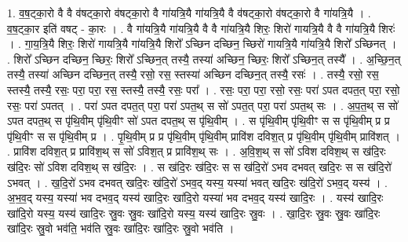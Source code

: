 \documentclass[17pt]{extarticle}
\begin{document}
1. व॒ष॒ट्का॒रो वै वै व॑षट्का॒रो व॑षट्का॒रो वै गा॑यत्रि॒यै गा॑यत्रि॒यै वै व॑षट्का॒रो व॑षट्का॒रो वै गा॑यत्रि॒यै । . व॒ष॒ट्का॒र इति॑ वषट् - का॒रः । . वै गा॑यत्रि॒यै गा॑यत्रि॒यै वै वै गा॑यत्रि॒यै शिरः॒ शिरो॑ गायत्रि॒यै वै वै गा॑यत्रि॒यै शिरः॑ । . गा॒य॒त्रि॒यै शिरः॒ शिरो॑ गायत्रि॒यै गा॑यत्रि॒यै शिरो᳚ ऽच्छिन दच्छिन॒ च्छिरो॑ गायत्रि॒यै गा॑यत्रि॒यै शिरो᳚ ऽच्छिनत् । . शिरो᳚ ऽच्छिन दच्छिन॒ च्छिरः॒ शिरो᳚ ऽच्छिन॒त् तस्यै॒ तस्या॑ अच्छिन॒ च्छिरः॒ शिरो᳚ ऽच्छिन॒त् तस्यै᳚ । . अ॒च्छि॒न॒त् तस्यै॒ तस्या॑ अच्छिन दच्छिन॒त् तस्यै॒ रसो॒ रस॒ स्तस्या॑ अच्छिन दच्छिन॒त् तस्यै॒ रसः॑ । . तस्यै॒ रसो॒ रस॒ स्तस्यै॒ तस्यै॒ रसः॒ परा॒ परा॒ रस॒ स्तस्यै॒ तस्यै॒ रसः॒ परा᳚ । . रसः॒ परा॒ परा॒ रसो॒ रसः॒ परा॑ ऽपत दपत॒त् परा॒ रसो॒ रसः॒ परा॑ ऽपतत् । . परा॑ ऽपत दपत॒त् परा॒ परा॑ ऽपत॒थ् स सो॑ ऽपत॒त् परा॒ परा॑ ऽपत॒थ् सः । . अ॒प॒त॒थ् स सो॑ ऽपत दपत॒थ् स पृ॑थि॒वीम् पृ॑थि॒वीꣳ सो॑ ऽपत दपत॒थ् स पृ॑थि॒वीम् । . स पृ॑थि॒वीम् पृ॑थि॒वीꣳ स स पृ॑थि॒वीम् प्र प्र पृ॑थि॒वीꣳ स स पृ॑थि॒वीम् प्र । . पृ॒थि॒वीम् प्र प्र पृ॑थि॒वीम् पृ॑थि॒वीम् प्रावि॑श दविश॒त् प्र पृ॑थि॒वीम् पृ॑थि॒वीम् प्रावि॑शत् । . प्रावि॑श दविश॒त् प्र प्रावि॑श॒थ् स सो॑ ऽविश॒त् प्र प्रावि॑श॒थ् सः । . अ॒वि॒श॒थ् स सो॑ ऽविश दविश॒थ् स ख॑दि॒रः ख॑दि॒रः सो॑ ऽविश दविश॒थ् स ख॑दि॒रः । . स ख॑दि॒रः ख॑दि॒रः स स ख॑दि॒रो॑ ऽभव दभवत् खदि॒रः स स ख॑दि॒रो॑ ऽभवत् । . ख॒दि॒रो॑ ऽभव दभवत् खदि॒रः ख॑दि॒रो॑ ऽभव॒द् यस्य॒ यस्या॑ भवत् खदि॒रः ख॑दि॒रो॑ ऽभव॒द् यस्य॑ । . अ॒भ॒व॒द् यस्य॒ यस्या॑ भव दभव॒द् यस्य॑ खादि॒रः खा॑दि॒रो यस्या॑ भव दभव॒द् यस्य॑ खादि॒रः । . यस्य॑ खादि॒रः खा॑दि॒रो यस्य॒ यस्य॑ खादि॒रः स्रु॒वः स्रु॒वः खा॑दि॒रो यस्य॒ यस्य॑ खादि॒रः स्रु॒वः । . खा॒दि॒रः स्रु॒वः स्रु॒वः खा॑दि॒रः खा॑दि॒रः स्रु॒वो भव॑ति॒ भव॑ति स्रु॒वः खा॑दि॒रः खा॑दि॒रः स्रु॒वो भव॑ति । \newline
\end{document}
